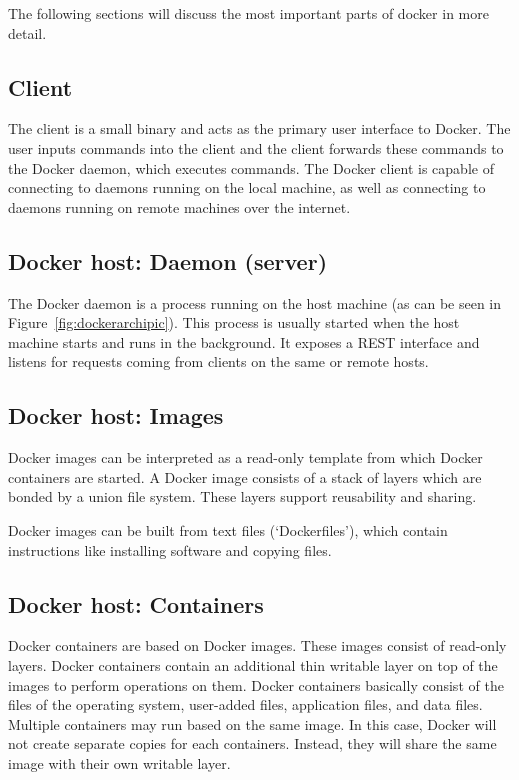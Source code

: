 The following sections will discuss the most important parts of docker in more detail.

\subsection{Client}
The client is a small binary and acts as the primary user interface to Docker. The user inputs commands into the client and the client forwards these commands to the Docker daemon, which executes commands.
The Docker client is capable of connecting to daemons running on the local machine, as well as connecting to daemons running on remote machines over the internet.

\subsection{Docker host: Daemon (server)}
The Docker daemon is a process running on the host machine (as can be seen in Figure~\ref{fig:dockerarchipic}). This process is usually started when the host machine starts and runs in the background. It exposes a REST interface and listens for requests coming from clients on the same or remote hosts.

\subsection{Docker host: Images}
Docker images can be interpreted as a read-only template from which Docker containers are
started. A Docker image consists of a stack of layers which are bonded by a union file system. These layers support reusability and sharing.

Docker images can be built from text files (`Dockerfiles'), which contain instructions like installing software and copying files.

\subsection{Docker host: Containers}
Docker containers are based on Docker images. These images consist of read-only
layers. Docker containers contain an additional thin writable layer on top of the images to
perform operations on them. Docker containers basically consist of the files of the operating system,
user-added files, application files, and data files. Multiple containers may run
based on the same image. In this case, Docker will not create separate copies for
each containers. Instead, they will share the same image with their own writable layer.

